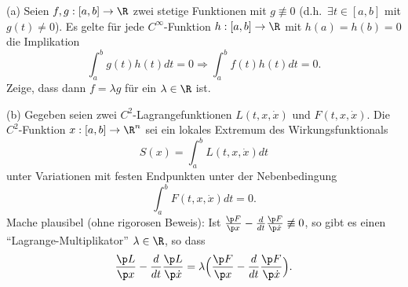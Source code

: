 \begin{prob}
(a) Seien $f,g:[a,b]\to\R$ zwei stetige Funktionen mit $g\not\equiv 0$
(d.h.~$\exists t\in[a,b]$ mit $g(t)\neq 0$). Es gelte f\"ur jede
$C^\infty$-Funktion $h:[a,b]\to\R$ mit $h(a)=h(b)=0$ die Implikation
$$
  \int_a^bg(t)h(t)dt=0 \Longrightarrow \int_a^bf(t)h(t)dt=0.
$$
Zeige, dass dann $f=\lambda g$ f\"ur ein $\lambda\in\R$ ist. 

(b) Gegeben seien zwei $C^2$-Lagrangefunktionen $L(t,x,\dot x)$ und
$F(t,x,\dot x)$. Die $C^2$-Funktion $x:[a,b]\to\R^n$ sei ein lokales
Extremum des Wirkungsfunktionals
$$
   S(x) = \int_a^bL(t,x,\dot x)dt
$$
unter Variationen mit festen Endpunkten unter der Nebenbedingung
$$
   \int_a^bF(t,x,\dot x)dt = 0. 
$$
Mache plausibel (ohne rigorosen Beweis): Ist $\frac{\p F}{\p x}-\frac{d}{dt}\frac{\p F}{\p\dot
  x}\not\equiv 0$, so gibt es einen ``Lagrange-Multiplikator''
$\lambda\in\R$, so dass
$$
   \frac{\p L}{\p x}-\frac{d}{dt}\frac{\p L}{\p\dot x}
   = \lambda\Bigl(\frac{\p F}{\p x}-\frac{d}{dt}\frac{\p F}{\p\dot x}\Bigr). 
$$
\end{prob}

